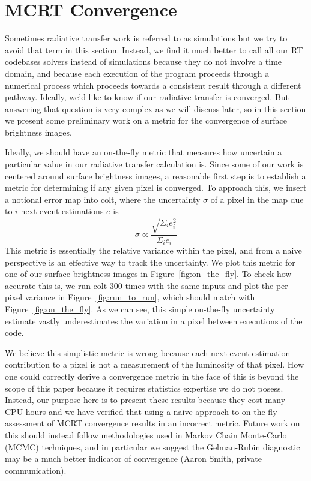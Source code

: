 \section{MCRT Convergence}
Sometimes radiative transfer work is referred to as simulations but we try to avoid that term in this section.
Instead, we find it much better to call all our RT codebases solvers instead of simulations because they do not involve a time domain, and because each execution of the program proceeds through a numerical process which proceeds towards a consistent result through a different pathway.
Ideally, we'd like to know if our radiative transfer is converged.
But answering that question is very complex as we will discuss later, so in this section we present some preliminary work on a metric for the convergence of surface brightness images.

Ideally, we should have an on-the-fly metric that measures how uncertain a particular value in our radiative transfer calculation is.
Since some of our work is centered around surface brightness images, a reasonable first step is to establish a metric for determining if any given pixel is converged.
To approach this, we insert a notional error map into {\sc colt}, where the uncertainty $\sigma$ of a pixel in the map due to $i$ next event estimations $e$ is
\begin{equation}
    \sigma \propto \frac{\sqrt{\Sigma_{i} e_{i}^{2}}}{\Sigma_{i} e_{i}}
    \label{eq:sb_uncertainty}
\end{equation}
This metric is essentially the relative variance within the pixel, and from a naive perspective is an effective way to track the uncertainty.
We plot this metric for one of our surface brightness images in Figure~\ref{fig:on_the_fly}.
To check how accurate this is, we run {\sc colt} 300 times with the same inputs and plot the per-pixel variance in Figure~\ref{fig:run_to_run}, which should match with Figure~\ref{fig:on_the_fly}.
As we can see, this simple on-the-fly uncertainty estimate vastly underestimates the variation in a pixel between executions of the code.

We believe this simplistic metric is wrong because each next event estimation contribution to a pixel is not a measurement of the luminosity of that pixel.
How one could correctly derive a convergence metric in the face of this is beyond the scope of this paper because it requires statistics expertise we do not posess.
Instead, our purpose here is to present these results because they cost many CPU-hours and we have verified that using a naive approach to on-the-fly assessment of MCRT convergence results in an incorrect metric.
Future work on this should instead follow methodologies used in Markov Chain Monte-Carlo (MCMC) techniques, and in particular we suggest the Gelman-Rubin diagnostic may be a much better indicator of convergence (Aaron Smith, private communication).

